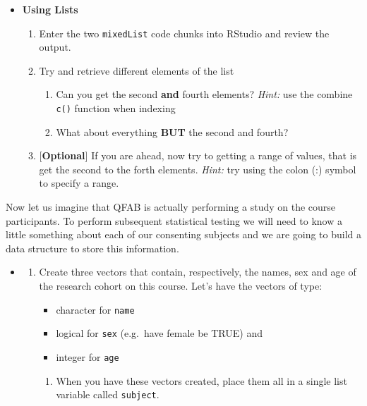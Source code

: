 \documentclass[a4paper]{book}
\providecommand{\tightlist}{%
  \setlength{\itemsep}{0pt}\setlength{\parskip}{0pt}}
\newenvironment{rmdblock}[1]
  {\vspace{1.5em}\begin{shaded*}
  \begin{itemize}
  \renewcommand{\labelitemi}{
    \raisebox{-.7\height}[0pt][0pt]{
      {\setkeys{Gin}{width=3em,keepaspectratio}\texttt{[image: images/\#1]}}
    }
  }
  \item
  }
  {
  \end{itemize}
  \end{shaded*}
  }
\newenvironment{rmdexercise}
  {\begin{rmdblock}{exercise}}
  {\end{rmdblock}}
\begin{document}
\begin{rmdexercise}
\textbf{Using Lists}

\begin{enumerate}
\def\labelenumi{\arabic{enumi}.}
\item
  Enter the two \texttt{mixedList} code chunks into RStudio and review
  the output.
\item
  Try and retrieve different elements of the list

  \begin{enumerate}
  \def\labelenumii{\alph{enumii})}
  \tightlist
  \item
    Can you get the second \textbf{and} fourth elements? \emph{Hint:}
    use the combine \texttt{c()} function when indexing
  \item
    What about everything \textbf{BUT} the second and fourth?
  \end{enumerate}
\item
  {[}\textbf{Optional}{]} If you are ahead, now try to getting a range
  of values, that is get the second to the forth elements. \emph{Hint:}
  try using the colon (:) symbol to specify a range.
\end{enumerate}
\end{rmdexercise}

Now let us imagine that QFAB is actually performing a study on the
course participants. To perform subsequent statistical testing we will
need to know a little something about each of our consenting subjects
and we are going to build a data structure to store this information.

\begin{rmdexercise}
\begin{enumerate}
\def\labelenumi{\arabic{enumi}.}
\setcounter{enumi}{2}
\item
  Create three vectors that contain, respectively, the names, sex and
  age of the research cohort on this course. Let's have the vectors of
  type:

  \begin{itemize}
  \tightlist
  \item
    character for \texttt{name}
  \item
    logical for \texttt{sex} (e.g.~have female be TRUE) and
  \item
    integer for \texttt{age}
  \end{itemize}

  \begin{enumerate}
  \def\labelenumii{\alph{enumii})}
  \tightlist
  \item
    When you have these vectors created, place them all in a single list
    variable called \texttt{subject}.
  \end{enumerate}
\end{enumerate}
\end{rmdexercise}
\end{document}
